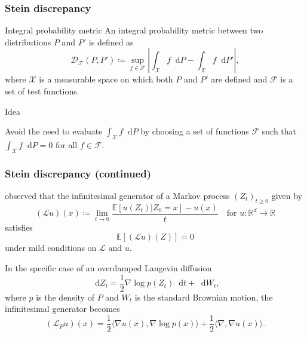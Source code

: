 \documentclass{beamer}
\newcommand*\diff{\mathop{}\!\mathrm{d}}
\begin{document}
\begin{frame}
\frametitle{Stein discrepancy}

\begin{block}{Integral probability metric}
An integral probability metric between two distributions $P$ and $P'$ is defined as
\begin{equation*}
\mathcal{D}_{\mathcal{F}}(P, P') \coloneq \sup_{f \in \mathcal{F}}\left|\int_\mathcal{X} f \diff P - \int_\mathcal{X} f \diff P' \right|,
\end{equation*}
where $\mathcal{X}$ is a measurable space on which both $P$ and $P'$ are defined and $\mathcal{F}$ is a set of test functions.
\end{block}

\begin{block}{Idea}

Avoid the need to evaluate $\int_\mathcal{X} f \diff P$ by choosing a set of functions $\mathcal{F}$ such that $\int_\mathcal{X} f \diff P = 0$ for all $f \in \mathcal{F}$.

\end{block}

\end{frame}

\begin{frame}
\frametitle{Stein discrepancy (continued)}

\cite{gorhamMeasuringSampleQuality2015} observed that the infinitesimal generator of a Markov process $(Z_t)_{t \geq 0}$ given by
\begin{equation*}
(\mathcal{L}u)(x) \coloneq \lim_{t \to 0} \frac{\mathbb{E}[u(Z_t) | Z_0 = x] - u(x)}{t} \quad \text{for } u:\mathbb{R}^d \to \mathbb{R}
\end{equation*}
satisfies
\begin{equation*}
\mathbb{E}[(\mathcal{L} u) (Z)] = 0
\end{equation*}
under mild conditions on $\mathcal{L}$ and $u$.

In the specific case of an overdamped Langevin diffusion
$$\diff Z_t = \frac{1}{2} \nabla \log p(Z_t) \diff t + \diff W_t,$$
where $p$ is the density of $P$ and $W_t$ is the standard Brownian motion, the infinitesimal generator becomes
$$(\mathcal{L}_P u)(x) = \frac{1}{2} \langle \nabla u(x), \nabla \log p(x)\rangle + \frac{1}{2}\langle \nabla, \nabla u(x) \rangle.$$

\end{frame}
\end{document}
